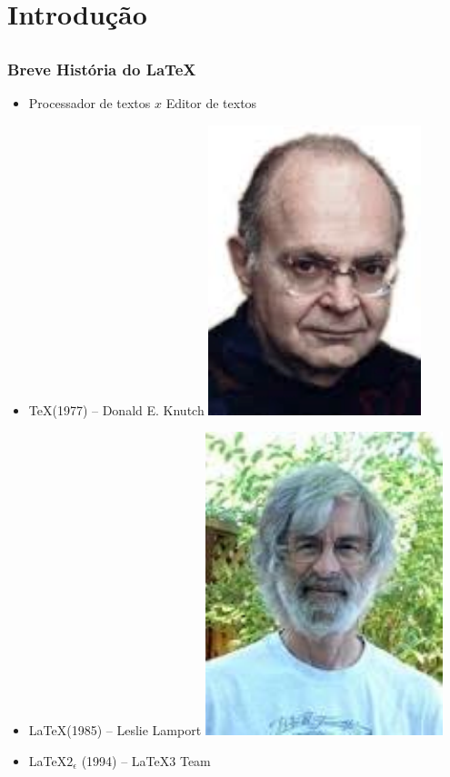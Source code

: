 \section{Introdução}
\subsection{}

\begin{frame}
\frametitle{Breve História do \LaTeX}

\begin{itemize}
  \item Processador de textos $x$ Editor de textos
  \item \TeX (1977) -- Donald E. Knutch \includegraphics[scale=.4,keepaspectratio]{../img/knutch.pdf} 
  \item \LaTeX (1985) -- Leslie Lamport  \includegraphics[scale=.4,keepaspectratio]{../img/lamport.pdf}
  \item \LaTeX $2_{\epsilon}$ (1994) -- LaTeX3 Team
\end{itemize}
\end{frame}


